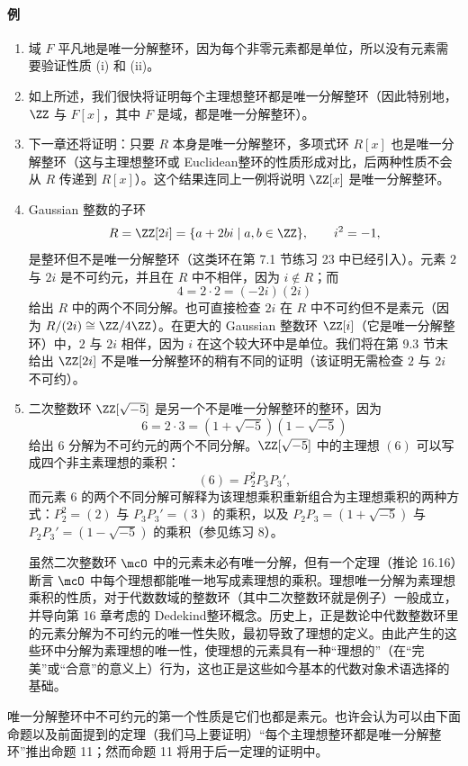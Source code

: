 \paragraph{例}
\begin{enumerate}[label=(\arabic*)]
	\item 域 $F$ 平凡地是唯一分解整环，因为每个非零元素都是单位，所以没有元素需要验证性质 (i) 和 (ii)。
	\item 如上所述，我们很快将证明每个主理想整环都是唯一分解整环（因此特别地，$\ZZ$ 与 $F[x]$，其中 $F$ 是域，都是唯一分解整环）。
	\item 下一章还将证明：只要 $R$ 本身是唯一分解整环，多项式环 $R[x]$ 也是唯一分解整环（这与主理想整环或 Euclidean整环的性质形成对比，后两种性质不会从 $R$ 传递到 $R[x]$）。这个结果连同上一例将说明 $\ZZ[x]$ 是唯一分解整环。
	\item Gaussian 整数的子环
	\[
	R=\ZZ[2i]=\{a+2bi\mid a,b\in\ZZ\},\qquad i^2=-1,
	\]
	是整环但不是唯一分解整环（这类环在第 7.1 节练习 23 中已经引入）。元素 $2$ 与 $2i$ 是不可约元，并且在 $R$ 中不相伴，因为 $i\notin R$；而
	\[
	4=2\cdot2=(-2i)(2i)
	\]
	给出 $R$ 中的两个不同分解。也可直接检查 $2i$ 在 $R$ 中不可约但不是素元（因为 $R/(2i)\cong\ZZ/4\ZZ$）。在更大的 Gaussian 整数环 $\ZZ[i]$（它是唯一分解整环）中，$2$ 与 $2i$ 相伴，因为 $i$ 在这个较大环中是单位。我们将在第 9.3 节末给出 $\ZZ[2i]$ 不是唯一分解整环的稍有不同的证明（该证明无需检查 $2$ 与 $2i$ 不可约）。
	\item 二次整数环 $\ZZ[\sqrt{-5}]$ 是另一个不是唯一分解整环的整环，因为
	\[
	6=2\cdot3=(1+\sqrt{-5})(1-\sqrt{-5})
	\]
	给出 $6$ 分解为不可约元的两个不同分解。$\ZZ[\sqrt{-5}]$ 中的主理想 $(6)$ 可以写成四个非主素理想的乘积：
	\[
	(6)=P_2^2P_3P_3',
	\]
	而元素 $6$ 的两个不同分解可解释为该理想乘积重新组合为主理想乘积的两种方式：$P_2^2=(2)$ 与 $P_3P_3'=(3)$ 的乘积，以及 $P_2P_3=(1+\sqrt{-5})$ 与 $P_2P_3'=(1-\sqrt{-5})$ 的乘积（参见练习 8）。
	
	虽然二次整数环 $\mcO$ 中的元素未必有唯一分解，但有一个定理（推论 16.16）断言 $\mcO$ 中每个理想都能唯一地写成素理想的乘积。理想唯一分解为素理想乘积的性质，对于代数数域的整数环（其中二次整数环就是例子）一般成立，并导向第 16 章考虑的 Dedekind整环概念。历史上，正是数论中代数整数环里的元素分解为不可约元的唯一性失败，最初导致了理想的定义。由此产生的这些环中分解为素理想的唯一性，使理想的元素具有一种“理想的”（在“完美”或“合意”的意义上）行为，这也正是这些如今基本的代数对象术语选择的基础。
\end{enumerate}

唯一分解整环中不可约元的第一个性质是它们也都是素元。也许会认为可以由下面命题以及前面提到的定理（我们马上要证明）“每个主理想整环都是唯一分解整环”推出命题 11；然而命题 11 将用于后一定理的证明中。

